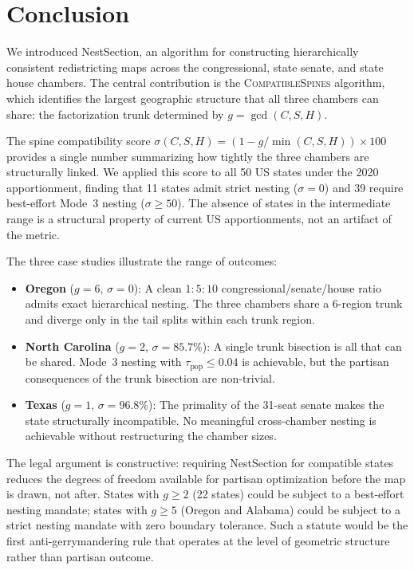 \section{Conclusion}
\label{sec:conclusion}

We introduced NestSection, an algorithm for constructing hierarchically
consistent redistricting maps across the congressional, state senate, and state
house chambers.  The central contribution is the \textsc{CompatibleSpines}
algorithm, which identifies the largest geographic structure that all three
chambers can share: the factorization trunk determined by $g = \gcd(C, S, H)$.

The spine compatibility score $\sigma(C, S, H) = (1 - g/\min(C,S,H)) \times 100$
provides a single number summarizing how tightly the three chambers are
structurally linked.  We applied this score to all 50 US states under the 2020
apportionment, finding that 11 states admit strict nesting ($\sigma = 0$) and
39 require best-effort Mode~3 nesting ($\sigma \geq 50$).  The absence of
states in the intermediate range is a structural property of current US
apportionments, not an artifact of the metric.

The three case studies illustrate the range of outcomes:
\begin{itemize}
  \item \textbf{Oregon} ($g = 6$, $\sigma = 0$): A clean $1:5:10$
        congressional/senate/house ratio admits exact hierarchical nesting.
        The three chambers share a 6-region trunk and diverge only in the
        tail splits within each trunk region.
  \item \textbf{North Carolina} ($g = 2$, $\sigma = 85.7\%$): A single trunk
        bisection is all that can be shared.  Mode~3 nesting with
        $\tau_\text{pop} \leq 0.04$ is achievable, but the partisan consequences
        of the trunk bisection are non-trivial.
  \item \textbf{Texas} ($g = 1$, $\sigma = 96.8\%$): The primality of the
        31-seat senate makes the state structurally incompatible.  No meaningful
        cross-chamber nesting is achievable without restructuring the chamber
        sizes.
\end{itemize}

The legal argument is constructive: requiring NestSection for compatible states
reduces the degrees of freedom available for partisan optimization before the
map is drawn, not after.  States with $g \geq 2$ (22 states) could be subject
to a best-effort nesting mandate; states with $g \geq 5$ (Oregon and Alabama)
could be subject to a strict nesting mandate with zero boundary tolerance.
Such a statute would be the first anti-gerrymandering rule that operates at
the level of geometric structure rather than partisan outcome.

